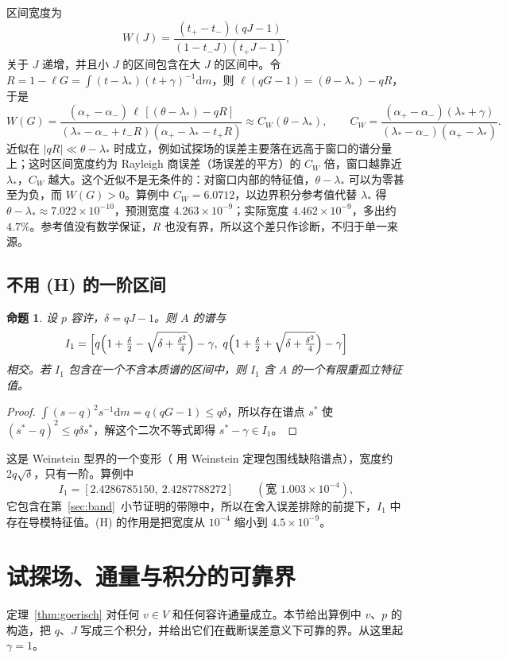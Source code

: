 \documentclass[11pt,a4paper,fontset=fandol]{ctexart}
\newcommand{\dd}{\mathrm{d}}
\theoremstyle{plain}
\newtheorem{proposition}[theorem]{命题}
\theoremstyle{definition}
\theoremstyle{remark}
\begin{document}
区间宽度为
\[
W(J)=\frac{(t_+-t_-)(qJ-1)}{(1-t_-J)(t_+J-1)},
\]
关于 $J$ 递增，并且小 $J$ 的区间包含在大 $J$ 的区间中。令 $R=1-\ell G=\int(t-\lambda_*)(t+\gamma)^{-1}\dd m$，则 $\ell(qG-1)=(\theta-\lambda_*)-qR$，于是
\[
W(G)=\frac{(\alpha_+-\alpha_-)\,\ell\,[(\theta-\lambda_*)-qR]}{(\lambda_*-\alpha_-+t_-R)(\alpha_+-\lambda_*-t_+R)}\approx C_W(\theta-\lambda_*),\qquad
C_W=\frac{(\alpha_+-\alpha_-)(\lambda_*+\gamma)}{(\lambda_*-\alpha_-)(\alpha_+-\lambda_*)} .
\]
近似在 $|qR|\ll\theta-\lambda_*$ 时成立，例如试探场的误差主要落在远高于窗口的谱分量上；这时区间宽度约为 Rayleigh 商误差（场误差的平方）的 $C_W$ 倍，窗口越靠近 $\lambda_*$，$C_W$ 越大。这个近似不是无条件的：对窗口内部的特征值，$\theta-\lambda_*$ 可以为零甚至为负，而 $W(G)>0$。算例中 $C_W=6.0712$，以边界积分参考值代替 $\lambda_*$ 得 $\theta-\lambda_*\approx7.022\times10^{-10}$，预测宽度 $4.263\times10^{-9}$；实际宽度 $4.462\times10^{-9}$，多出约 $4.7\%$。参考值没有数学保证，$R$ 也没有界，所以这个差只作诊断，不归于单一来源。

\subsection{不用 (H) 的一阶区间}

\begin{proposition}
\label{prop:first-order}
设 $p$ 容许，$\delta=qJ-1$。则 $A$ 的谱与
\[
I_1=\Bigl[q\Bigl(1+\tfrac\delta2-\sqrt{\delta+\tfrac{\delta^2}4}\Bigr)-\gamma,\ q\Bigl(1+\tfrac\delta2+\sqrt{\delta+\tfrac{\delta^2}4}\Bigr)-\gamma\Bigr]
\]
相交。若 $I_1$ 包含在一个不含本质谱的区间中，则 $I_1$ 含 $A$ 的一个有限重孤立特征值。
\end{proposition}

\begin{proof}
$\int(s-q)^2s^{-1}\dd m=q(qG-1)\le q\delta$，所以存在谱点 $s^*$ 使 $(s^*-q)^2\le q\delta s^*$，解这个二次不等式即得 $s^*-\gamma\in I_1$。
\end{proof}

这是 Weinstein 型界的一个变形（\cite{BrownHoangPlumWood2009} 用 Weinstein 定理包围线缺陷谱点），宽度约 $2q\sqrt\delta$，只有一阶。算例中
\[
I_1=[2.4286785150,\ 2.4287788272]\qquad(\text{宽 }1.003\times10^{-4}),
\]
它包含在第~\ref{sec:band}~小节证明的带隙中，所以在舍入误差排除的前提下，$I_1$ 中存在导模特征值。(H) 的作用是把宽度从 $10^{-4}$ 缩小到 $4.5\times10^{-9}$。

\section{试探场、通量与积分的可靠界}
\label{sec:cert}
定理~\ref{thm:goerisch} 对任何 $v\in V$ 和任何容许通量成立。本节给出算例中 $v$、$p$ 的构造，把 $q$、$J$ 写成三个积分，并给出它们在截断误差意义下可靠的界。从这里起 $\gamma=1$。
\end{document}
